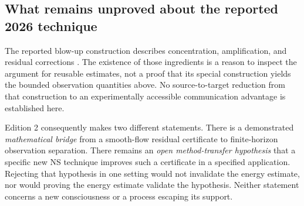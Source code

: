 \subsection{What remains unproved about the reported 2026 technique}
The reported blow-up construction describes concentration, amplification, and residual corrections \citep{openains}. The existence of those ingredients is a reason to inspect the argument for reusable estimates, not a proof that its special construction yields the bounded observation quantities above. No source-to-target reduction from that construction to an experimentally accessible communication advantage is established here.

Edition 2 consequently makes two different statements. There is a demonstrated \emph{mathematical bridge} from a smooth-flow residual certificate to finite-horizon observation separation. There remains an \emph{open method-transfer hypothesis} that a specific new NS technique improves such a certificate in a specified application. Rejecting that hypothesis in one setting would not invalidate the energy estimate, nor would proving the energy estimate validate the hypothesis. Neither statement concerns a new consciousness or a process escaping its support.

